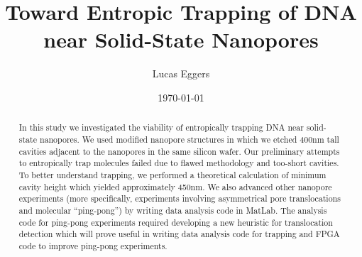 \documentclass[aps,prl,preprint,groupedaddress]{revtex4}
\begin{document}

\title{Toward Entropic Trapping of DNA near Solid-State Nanopores}


\author{Lucas Eggers}


\date{\today}

\begin{abstract}
In this study we investigated the viability of entropically trapping DNA near solid-state nanopores.
We used modified nanopore structures in which we etched 400nm tall cavities adjacent to the nanopores in the same silicon wafer.
Our preliminary attempts to entropically trap molecules failed due to flawed methodology and too-short cavities.
To better understand trapping, we performed a theoretical calculation of minimum cavity height which yielded approximately 450nm.
We also advanced other nanopore experiments (more specifically, experiments involving asymmetrical pore translocations and molecular ``ping-pong'') by writing data analysis code in MatLab.
The analysis code for ping-pong experiments required developing a new heuristic for translocation detection which will prove useful in writing data analysis code for trapping and FPGA code to improve ping-pong experiments.
\end{abstract}
\end{document}
